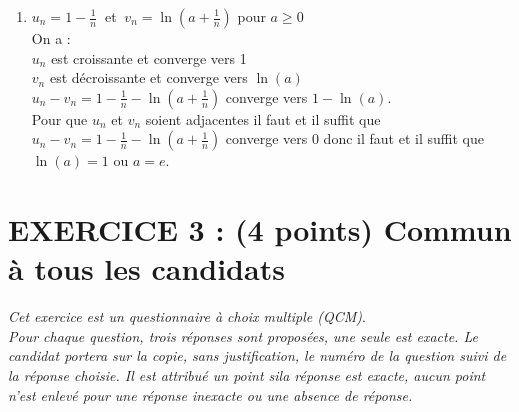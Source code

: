 \documentclass[a4paper,11pt]{book}
\begin{document}
\begin{enumerate}
\begin{itemize}
On tape :\\
{\tt solve(x\verb|^|2-x-1)}\\
On obtient :\\
{\tt [1/2*(1-sqrt(5)),1/2*(1+sqrt(5))]}\\
Sinon on a :\\
$u_n$ est croissante car la fonction $\ln(x+1)$ est croissante.\\
$u_n$ et $v_n$ sont divergentes car elles tendent 
vers $+\infty$ quand $n$ tend vers $+\infty$ :\\
Donc $ v_n$ n'est donc pas d\'ecroissante car sinon elle serait d\'ecroissante 
et minor\'ee par 0 donc convergente.\\
Donc les suites $u_n$ et $v_n$ ne sont pas adjacentes.
\item[$c)$] $\displaystyle u_n=1-\frac{1}{n}\ $ et $\ \displaystyle v_n=1+\frac{(-1)^n}{n}$\\
$u_n$ est croissante et converge vers 1.\\
$v_n=1+\frac{(-1)^n}{n}$ converge vers 1 mais $v_n$ n'est pas monotone.\\
Donc $u_n$ et $v_v$ ne sont pas adjacentes.
\end{itemize}
\item $\displaystyle u_n=1-\frac{1}{n}\ $  et  $\ \displaystyle v_n=\ln(a+\frac{1}{n})$ pour $a \geq 0$\\
On a :\\
$u_n$ est croissante et converge vers 1\\
$v_n$ est d\'ecroissante et converge vers $\ln(a)$\\
$u_n-v_n=1-\frac{1}{n}-\ln(a+\frac{1}{n})$ converge vers $1-\ln(a)$.\\
Pour que $u_n$ et $v_n$ soient adjacentes il faut et il suffit que 
$u_n-v_n=1-\frac{1}{n}-\ln(a+\frac{1}{n})$ converge vers 0 donc il faut et il 
suffit que $\ln(a)=1$ ou  $a=e$.
\end{enumerate}

\section{EXERCICE 3 : (4 points) Commun \`a tous les candidats}
{\it Cet exercice est un questionnaire \`a choix multiple (QCM)}.\\
{\it Pour chaque question, trois r\'eponses sont propos\'ees, une seule est exacte. Le candidat portera sur la copie, sans justification, le num\'ero de la question suivi de la r\'eponse choisie. Il est attribu\'e un point sila r\'eponse est exacte, aucun point n'est enlev\'e pour une r\'eponse 
inexacte ou une absence de r\'eponse.}
\end{document}
